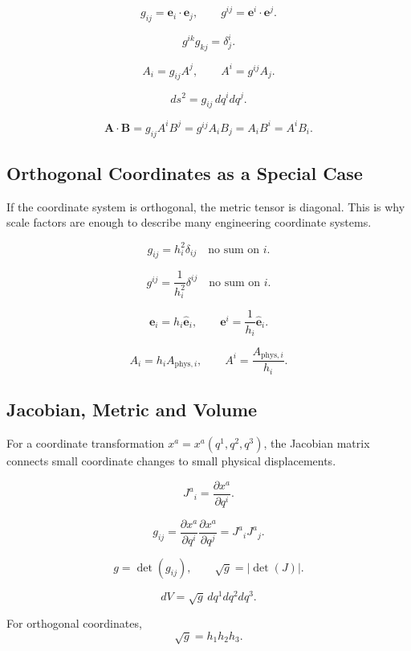 \documentclass{otscience}
\begin{document}
\begin{formulabox}
    \[
        g_{ij}=\mathbf{e}_i\cdot\mathbf{e}_j,
        \qquad
        g^{ij}=\mathbf{e}^i\cdot\mathbf{e}^j.
    \]

    \[
        g^{ik}g_{kj}=\delta^i_j.
    \]

    \[
        A_i=g_{ij}A^j,
        \qquad
        A^i=g^{ij}A_j.
    \]

    \[
        ds^2=g_{ij}\,dq^{i}dq^j.
    \]

    \[
        \mathbf{A}\cdot\mathbf{B}=g_{ij}A^{i}B^j=g^{ij}A_{i}B_j=A_{i}B^i=A^{i}B_i.
    \]
\end{formulabox}

\subsection{Orthogonal Coordinates as a Special Case}

If the coordinate system is orthogonal, the metric tensor is diagonal. This is why scale factors are enough to describe many engineering coordinate systems.

\begin{formulaboxnosplit}
    \[
        g_{ij}=h_i^2\delta_{ij}\quad\text{no sum on }i.
    \]

    \[
        g^{ij}=\frac{1}{h_i^2}\delta^{ij}\quad\text{no sum on }i.
    \]

    \[
        \mathbf{e}_i=h_i\hat{\mathbf{e}}_i,
        \qquad
        \mathbf{e}^i=\frac{1}{h_i}\hat{\mathbf{e}}_i.
    \]

    \[
        A_i=h_i A_{\text{phys},i},
        \qquad
        A^i=\frac{A_{\text{phys},i}}{h_i}.
    \]
\end{formulaboxnosplit}

\subsection{Jacobian, Metric and Volume}

For a coordinate transformation \(x^a=x^a(q^1,q^2,q^3)\), the Jacobian matrix connects small coordinate changes to small physical displacements.

\begin{formulabox}
    \[
        J^a{}_i=\frac{\partial x^a}{\partial q^i}.
    \]

    \[
        g_{ij}=\frac{\partial x^a}{\partial q^i}\frac{\partial x^a}{\partial q^j}=J^a{}_{i}J^a{}_j.
    \]

    \[
        g=\det(g_{ij}),
        \qquad
        \sqrt{g}=\left|\det(J)\right|.
    \]

    \[
        dV=\sqrt{g}\,dq^1dq^2dq^3.
    \]

    For orthogonal coordinates,
    \[
        \sqrt{g}=h_1h_2h_3.
    \]
\end{formulabox}
\end{document}
